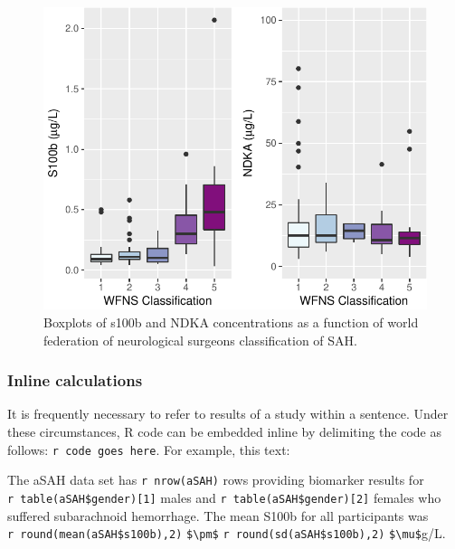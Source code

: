 \documentclass[]{elsarticle} %
\begin{document}
\begin{figure}[H]
\includegraphics{fig4-1} \caption{Boxplots of s100b and NDKA concentrations as a function of world federation of neurological surgeons classification of SAH.}\label{fig:fig4}
\end{figure}

\hypertarget{inline-calculations}{%
\subsubsection{Inline calculations}\label{inline-calculations}}

It is frequently necessary to refer to results of a study within a
sentence. Under these circumstances, R code can be embedded inline by
delimiting the code as follows:
\texttt{\textasciigrave{}r\ code\ goes\ here\textasciigrave{}}. For
example, this text:

\vspace{12pt}

\noindent The aSAH data set has
\texttt{\textasciigrave{}r\ nrow(aSAH)\textasciigrave{}} rows providing
biomarker results for
\texttt{\textasciigrave{}r\ table(aSAH\$gender){[}1{]}\textasciigrave{}}
males and
\texttt{\textasciigrave{}r\ table(aSAH\$gender){[}2{]}\textasciigrave{}}
females who suffered subarachnoid hemorrhage. The mean S100b for all
participants was
\texttt{\textasciigrave{}r\ round(mean(aSAH\$s100b),2)\textasciigrave{}}
\texttt{\$\textbackslash{}pm\$}
\texttt{\textasciigrave{}r\ round(sd(aSAH\$s100b),2)\textasciigrave{}}
\texttt{\$\textbackslash{}mu\$}g/L.
\end{document}
